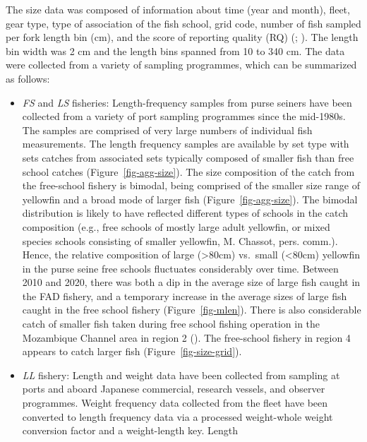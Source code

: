\documentclass[
]{scrartcl}
\begin{document}
The size data was composed of information about time (year and month),
fleet, gear type, type of association of the fish school, grid code,
number of fish sampled per fork length bin (cm), and the score of
reporting quality (RQ)
(;
). The length bin
width was 2 cm and the length bins spanned from 10 to 340 cm. The data
were collected from a variety of sampling programmes, which can be
summarized as follows:

\begin{itemize}
\item
  \emph{FS} and \emph{LS} fisheries: Length-frequency samples from purse
  seiners have been collected from a variety of port sampling programmes
  since the mid-1980s. The samples are comprised of very large numbers
  of individual fish measurements. The length frequency samples are
  available by set type with sets catches from associated sets typically
  composed of smaller fish than free school catches
  (Figure~\ref{fig-agg-size}). The size composition of the catch from
  the free-school fishery is bimodal, being comprised of the smaller
  size range of yellowfin and a broad mode of larger fish
  (Figure~\ref{fig-agg-size}). The bimodal distribution is likely to
  have reflected different types of schools in the catch composition
  (e.g., free schools of mostly large adult yellowfin, or mixed species
  schools consisting of smaller yellowfin, M. Chassot, pers. comm.).
  Hence, the relative composition of large (\textgreater80cm) vs.~small
  (\textless80cm) yellowfin in the purse seine free schools fluctuates
  considerably over time. Between 2010 and 2020, there was both a dip in
  the average size of large fish caught in the FAD fishery, and a
  temporary increase in the average sizes of large fish caught in the
  free school fishery (Figure~\ref{fig-mlen}). There is also
  considerable catch of smaller fish taken during free school fishing
  operation in the Mozambique Channel area in region 2
  (). The
  free-school fishery in region 4 appears to catch larger fish
  (Figure~\ref{fig-size-grid}).
\item
  \emph{LL} fishery: Length and weight data have been collected from
  sampling at ports and aboard Japanese commercial, research vessels,
  and observer programmes. Weight frequency data collected from the
  fleet have been converted to length frequency data via a processed
  weight-whole weight conversion factor and a weight-length key. Length

\end{itemize}
\end{document}
